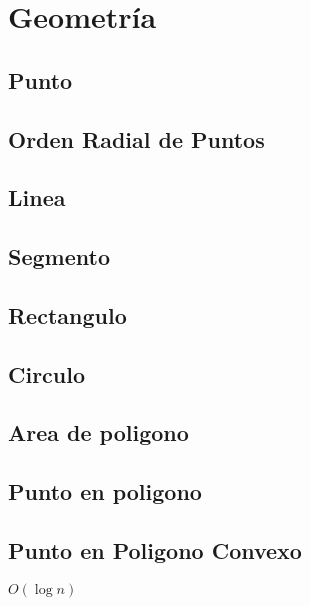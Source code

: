 
\section{Geometr\'ia}

\subsection{Punto}


\subsection{Orden Radial de Puntos}


\subsection{Linea}


\subsection{Segmento}


\subsection{Rectangulo}


\subsection{Circulo}


\subsection{Area de poligono}


\subsection{Punto en poligono}


\subsection{Punto en Poligono Convexo}
$O(\log{n})$


